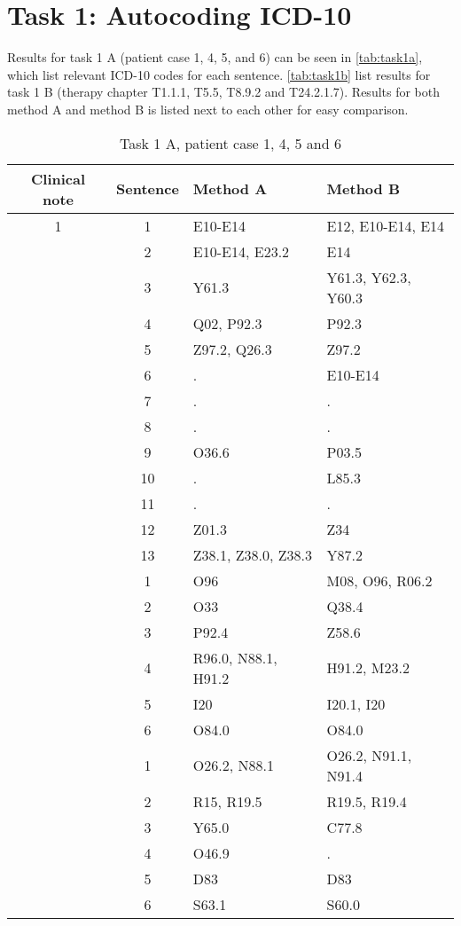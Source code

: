 \section{Task 1: Autocoding ICD-10}
Results for task 1 A (patient case 1, 4, 5, and 6) can be seen in
\autoref{tab:task1a}, which list relevant ICD-10 codes for each sentence.
\autoref{tab:task1b} list results for task 1 B (therapy chapter T1.1.1, T5.5,
T8.9.2 and T24.2.1.7). Results for both method A and method B is listed next
to each other for easy comparison.
\begin{table}[htbp] \footnotesize \center
\caption{Task 1 A, patient case 1, 4, 5 and 6\label{tab:task1a}}
\begin{tabular}{c c l l}
    \toprule
    Clinical note & Sentence & Method A & Method B \\
    \midrule
	1 & 1 & E10-E14 & E12, E10-E14, E14 \\
	 & 2 & E10-E14, E23.2 & E14 \\
	 & 3 & Y61.3 & Y61.3, Y62.3, Y60.3 \\
	 & 4 & Q02, P92.3 & P92.3 \\
	 & 5 & Z97.2, Q26.3 & Z97.2 \\
	 & 6 & . & E10-E14 \\
	 & 7 & . & . \\
	 & 8 & . & . \\
	 & 9 & O36.6 & P03.5 \\
	 & 10 & . & L85.3 \\
	 & 11 & . & . \\
	 & 12 & Z01.3 & Z34 \\
	 & 13 & Z38.1, Z38.0, Z38.3 & Y87.2 \\
	\addlinespace
	4 & 1 & O96 & M08, O96, R06.2 \\
	 & 2 & O33 & Q38.4 \\
	 & 3 & P92.4 & Z58.6 \\
	 & 4 & R96.0, N88.1, H91.2 & H91.2, M23.2 \\
	 & 5 & I20 & I20.1, I20 \\
	 & 6 & O84.0 & O84.0 \\
	\addlinespace
	5 & 1 & O26.2, N88.1 & O26.2, N91.1, N91.4 \\
	 & 2 & R15, R19.5 & R19.5, R19.4 \\
	 & 3 & Y65.0 & C77.8 \\
	 & 4 & O46.9 & . \\
	 & 5 & D83 & D83 \\
	 & 6 & S63.1 & S60.0 \\

\end{tabular}
\end{table}
